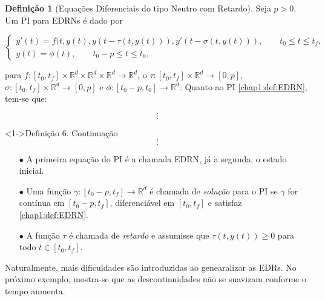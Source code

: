 \documentclass{beamer}
\newcommand{\R}{\mathbb{R}}
\theoremstyle{plain}
\theoremstyle{definition}
\newtheorem{defi}{Definição}
\begin{document}

\begin{frame}
     
    \begin{defi}[Equações Diferenciais do tipo Neutro com Retardo]
        Seja $p>0$. Um PI para EDRNs é dado por

        \small
        \begin{equation}
            \begin{cases}
                y'(t) = f(t, y(t), y(t - \tau(t, y(t))), y'(t - \sigma(t, y(t))), \qquad t_0 \leq t \leq t_f , \\
                y(t) = \phi(t), \qquad t_0 - p \leq t \leq t_0,
            \end{cases}
            \label{chap1:def:EDRN}
        \end{equation}


    \normalsize
    \par
    para $f:[t_0, t_f] \times \R^d \times \R^d \times \R^d \to \R^d$, {\color{red}o}  $\tau: [t_0, t_f] \times \R^d \to [0, p]$, $\sigma: [t_0, t_f] \times \R^d \to [0, p]$ e $\phi:[t_0 - p, t_0] \to \R^d $. Quanto ao PI \eqref{chap1:def:EDRN}, tem-se que:

    \[ \vdots \]


    \end{defi}

        

\end{frame}


\begin{frame}


    \begin{exampleblock}
        <1->{Definição 6. Continuação}
        \[ \vdots \]
        \begin{itemize}
            \item[$\bullet$] A primeira equação do PI é a chamada EDRN, já a segunda, o estado inicial.
            \item[$\bullet$] Uma função $\gamma:[t_0 - p, t_f] \to \R^d$ é chamada de \textit{solução} para o PI se $\gamma$ for contínua em $[t_0 - p, t_f]$, diferenciável em $[t_0, t_f]$ e satisfaz \eqref{chap1:def:EDRN}.
            \item[$\bullet$] A função $\tau$ é chamada de \textit{retardo} e assumisse que $\tau(t, y(t))\geq0$ para todo $t \in [t_0, t_f]$.
        \end{itemize} 

    \end{exampleblock}

    Naturalmente, mais dificuldades são introduzidas ao genearalizar as EDRs. No próximo exemplo, mostra-se que as descontinuidades não se suavizam conforme o tempo aumenta.


\end{frame}
\end{document}
